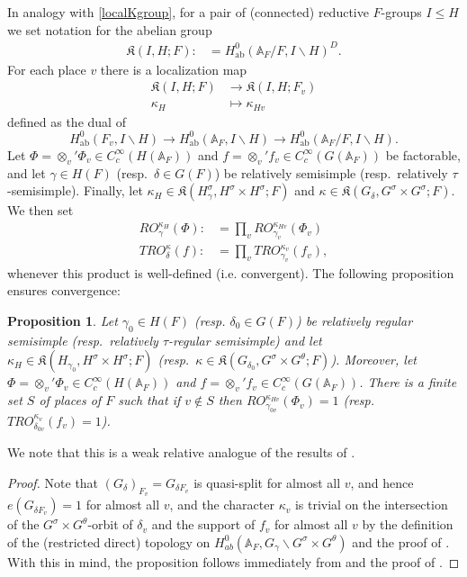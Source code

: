 \documentclass[12pt]{amsart}
\newtheorem{prop}[thm]{Proposition}
\theoremstyle{remark}
\numberwithin{equation}{section}
\newcommand{\A}{\mathbb{A}}
\newcommand{\lto}{\longrightarrow}
\theoremstyle{definition}
\numberwithin{equation}{subsection}
\begin{document}
In analogy with \eqref{localKgroup},  for a pair of (connected) reductive $F$-groups $I \leq H$ we set notation for the abelian group
\begin{align*}
\mathfrak{K}(I,H;F):&=H^0_{\mathrm{ab}}(\A_F/F,I \backslash H)^D.
\end{align*} For each place $v$ there is a localization map
\begin{align} \label{loc-map}
 \mathfrak{K}(I,H;F) &\lto \mathfrak{K}(I,H;F_v)\\
\nonumber \kappa_H &\longmapsto \kappa_{Hv}
\end{align}
defined as the dual of
$$
H^0_{\mathrm{ab}}(F_v,I \backslash H) \lto H^0_{\mathrm{ab}}(\A_F,I \backslash H) \lto H^0_{\mathrm{ab}}(\A_F/F,I \backslash H).
$$
Let $\Phi=\otimes_v'\Phi_v \in C_c^{\infty}(H(\A_F))$
and $f =\otimes_v'f_v \in C_c^{\infty}(G(\A_F))$ be factorable, and let
$\gamma \in H(F)$ (resp.~$\delta \in G(F)$) be relatively semisimple
(resp.~relatively $\tau$-semisimple).  Finally, let
$\kappa_H \in
\mathfrak{K}(H^{\sigma}_{\gamma},H^{\sigma} \times H^{\sigma};F)$ and
$\kappa\in \mathfrak{K}(G_{\delta},G^{\sigma} \times G^{\sigma};F)$.  We then set
\begin{align}
RO^{\kappa_H}_{\gamma}(\Phi):&=\prod_vRO^{\kappa_{Hv}}_{\gamma_v}(\Phi_v)\\
\nonumber TRO^{\kappa}_{\delta}(f):&=\prod_v
TRO^{\kappa_v}_{\gamma_v}(f_v),
\end{align}whenever this product is well-defined (i.e. convergent).  The following proposition ensures convergence:

\begin{prop}  \label{prop-1-ae}
Let $\gamma_0 \in H(F)$ (resp. $\delta_0 \in G(F)$) be relatively regular semisimple
(resp.~relatively $\tau$-regular semisimple) and let
$\kappa_H \in \mathfrak{K}(H_{\gamma_0},H^{\sigma} \times H^{\sigma};F)$
(resp.~$\kappa \in \mathfrak{K}(G_{\delta_0},G^{\sigma} \times G^{\theta};F)$).  Moreover, let
$\Phi=\otimes_v'\Phi_v \in C_c^{\infty}(H(\A_F))$ and $f=\otimes_v'f_v \in C_c^{\infty}(G(\A_F))$.
There is a finite set $S$ of places of $F$ such that if  $v \not \in S$  then
$RO_{\gamma_{0v}}^{\kappa_{Hv}}(\Phi_v)=1$ (resp. $TRO_{\delta_{0v}}^{\kappa_{v}}(f_v)=1$).
\end{prop}
We note that this is a weak relative analogue of the results of \cite[\S 7]{KottEllSing}.
\begin{proof}
Note that
$(G_{\delta})_{F_v}=G_{\delta F_v}$ is quasi-split for almost all $v$, and hence $e(G_{\delta F_v})=1$ for
almost all $v$, and the character $\kappa_v$ is trivial
on the intersection of the $G^{\sigma} \times G^{\theta}$-orbit of $\delta_v$ and the support of $f_v$
for almost all $v$ by the definition of the (restricted direct) topology on
$H^0_{ab}(\A_F,G_{\gamma}\backslash G^{\sigma} \times {G}^{\theta})$ \cite[\S 1.4-1.8]{Lab} and the proof of \cite[Proposition 3.4]{Hahn}.  With this
in mind, the proposition follows immediately from \cite[Proposition 3.2]{Hahn} and the proof of \cite[Proposition 3.4]{Hahn}.
\end{proof}
\end{document}
